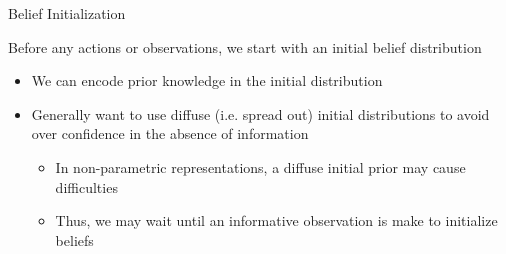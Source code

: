 \begin{frame}[fragile]{Belief Initialization}

Before any actions or observations, we start with an initial belief distribution
\begin{itemize}
    \item We can encode prior knowledge in the initial distribution
    \item Generally want to use diffuse (i.e. spread out) initial distributions to avoid over confidence in the absence of information
    \begin{itemize}
        \item In non-parametric representations, a diffuse initial prior may cause difficulties
        \item Thus, we may wait until an informative observation is make to initialize beliefs
    \end{itemize}
\end{itemize}


\end{frame}




